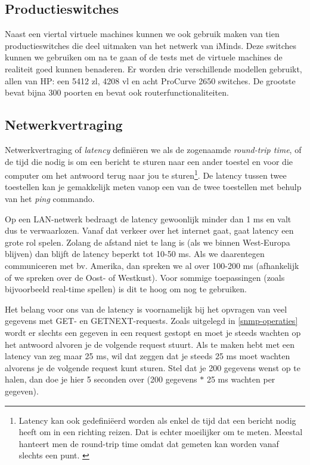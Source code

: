 \subsection{Productieswitches}


Naast een viertal virtuele machines kunnen we ook gebruik maken van tien productieswitches die deel uitmaken van het netwerk van iMinds.
Deze switches kunnen we gebruiken om na te gaan of de tests met de virtuele machines de realiteit goed kunnen benaderen.
Er worden drie verschillende modellen gebruikt, allen van HP: een 5412 zl, 4208 vl en acht ProCurve 2650 switches.
De grootste bevat bijna 300 poorten en bevat ook routerfunctionaliteiten.

\subsection{Netwerkvertraging}
\label{latency}

Netwerkvertraging of \textit{latency} definiëren we als de zogenaamde \textit{round-trip time},
of de tijd die nodig is om een bericht te sturen naar een ander toestel en voor die computer om het antwoord terug naar jou te sturen\footnote{
	Latency kan ook gedefiniëerd worden als enkel de tijd dat een bericht nodig heeft om in een richting reizen.
	Dat is echter moeilijker om te meten. Meestal hanteert men de round-trip time omdat dat gemeten kan worden vanaf slechts een punt. \cite{latency-wiki}
}.
De latency tussen twee toestellen kan je gemakkelijk meten vanop een van de twee toestellen met behulp van het \textit{ping} commando.

Op een LAN-netwerk bedraagt de latency gewoonlijk minder dan 1 ms en valt dus te verwaarlozen.
Vanaf dat verkeer over het internet gaat, gaat latency een grote rol spelen.
Zolang de afstand niet te lang is (als we binnen West-Europa blijven) dan blijft de latency beperkt tot 10-50 ms.
Als we daarentegen communiceren met bv. Amerika, dan spreken we al over 100-200 ms (afhankelijk of we spreken over de Oost- of Westkust).
Voor sommige toepassingen (zoals bijvoorbeeld real-time spellen) is dit te hoog om nog te gebruiken.

Het belang voor ons van de latency is voornamelijk bij het opvragen van veel gegevens met GET- en GETNEXT-requests.
Zoals uitgelegd in \cref{snmp-operaties} wordt er slechts een gegeven in een request gestopt en
moet je steeds wachten op het antwoord alvoren je de volgende request stuurt.
Als te maken hebt met een latency van zeg maar 25 ms, wil dat zeggen dat je steeds 25 ms moet wachten alvorens je de volgende request kunt sturen.
Stel dat je 200 gegevens wenst op te halen, dan doe je hier 5 seconden over (200 gegevens $*$ 25 ms wachten per gegeven).

